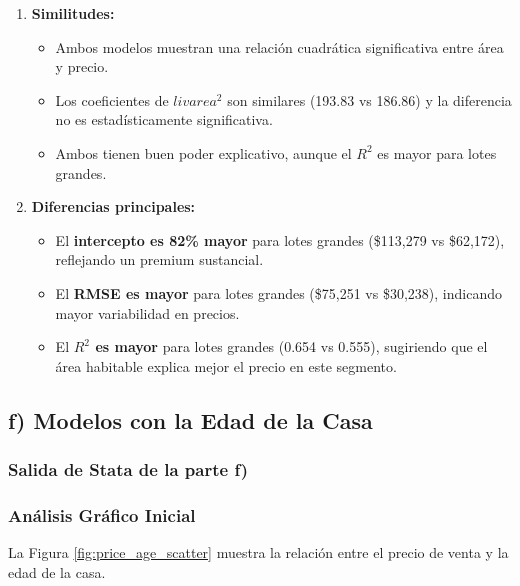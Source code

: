 \documentclass[12pt]{article}
\begin{document}
\begin{enumerate}
    \item \textbf{Similitudes:}
    \begin{itemize}
        \item Ambos modelos muestran una relación cuadrática significativa entre área y precio.
        \item Los coeficientes de $livarea^2$ son similares (193.83 vs 186.86) y la diferencia no es estadísticamente significativa.
        \item Ambos tienen buen poder explicativo, aunque el $R^2$ es mayor para lotes grandes.
    \end{itemize}
    
    \item \textbf{Diferencias principales:}
    \begin{itemize}
        \item El \textbf{intercepto es 82\% mayor} para lotes grandes (\$113,279 vs \$62,172), reflejando un premium sustancial.
        \item El \textbf{RMSE es mayor} para lotes grandes (\$75,251 vs \$30,238), indicando mayor variabilidad en precios.
        \item El \textbf{$R^2$ es mayor} para lotes grandes (0.654 vs 0.555), sugiriendo que el área habitable explica mejor el precio en este segmento.
    \end{itemize}
    
\end{enumerate}

\subsection*{f) Modelos con la Edad de la Casa}

\subsubsection*{Salida de Stata de la parte f)}

\subsubsection*{Análisis Gráfico Inicial}

La Figura \ref{fig:price_age_scatter} muestra la relación entre el precio de venta y la edad de la casa.
\end{document}
